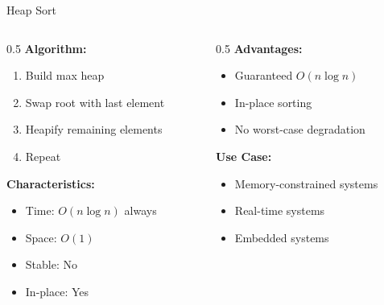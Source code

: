 \documentclass[aspectratio=169,xcolor=dvipsnames]{beamer}
\begin{document}
\begin{frame}{Heap Sort}
  \begin{columns}
    \begin{column}{0.5\textwidth}
      \textbf{Algorithm:}
      \begin{enumerate}
        \item Build max heap
        \item Swap root with last element
        \item Heapify remaining elements
        \item Repeat
      \end{enumerate}

      \vspace{0.3cm}
      \textbf{Characteristics:}
      \begin{itemize}
        \item Time: $O(n \log n)$ always
        \item Space: $O(1)$
        \item Stable: No
        \item In-place: Yes
      \end{itemize}
    \end{column}

    \begin{column}{0.5\textwidth}
      \textbf{Advantages:}
      \begin{itemize}
        \item Guaranteed $O(n \log n)$
        \item In-place sorting
        \item No worst-case degradation
      \end{itemize}

      \vspace{0.3cm}
      \textbf{Use Case:}
      \begin{itemize}
        \item Memory-constrained systems
        \item Real-time systems
        \item Embedded systems
      \end{itemize}
    \end{column}
  \end{columns}
\end{frame}
\end{document}
